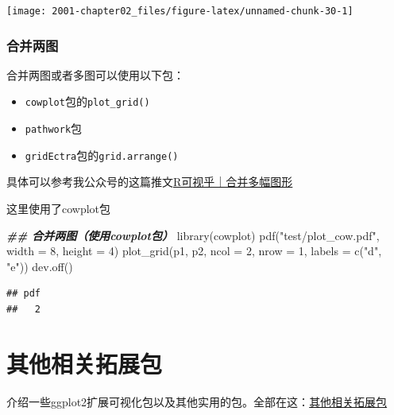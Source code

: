 \documentclass[
]{book}
\newenvironment{Shaded}{\begin{snugshade}}{\end{snugshade}}
\newcommand{\AttributeTok}[1]{\textcolor[rgb]{0.77,0.63,0.00}{#1}}
\newcommand{\DecValTok}[1]{\textcolor[rgb]{0.00,0.00,0.81}{#1}}
\newcommand{\DocumentationTok}[1]{\textcolor[rgb]{0.56,0.35,0.01}{\textbf{\textit{#1}}}}
\newcommand{\FunctionTok}[1]{\textcolor[rgb]{0.00,0.00,0.00}{#1}}
\newcommand{\NormalTok}[1]{#1}
\newcommand{\StringTok}[1]{\textcolor[rgb]{0.31,0.60,0.02}{#1}}
\providecommand{\tightlist}{%
  \setlength{\itemsep}{0pt}\setlength{\parskip}{0pt}}
\begin{document}
\begin{center}\texttt{[image: 2001-chapter02\_files/figure-latex/unnamed-chunk-30-1]} \end{center}

\hypertarget{ux5408ux5e76ux4e24ux56fe}{%
\subsection{合并两图}\label{ux5408ux5e76ux4e24ux56fe}}

合并两图或者多图可以使用以下包：

\begin{itemize}
\tightlist
\item
  \texttt{cowplot}包的\texttt{plot\_grid()}
\item
  \texttt{pathwork}包
\item
  \texttt{gridEctra}包的\texttt{grid.arrange()}
\end{itemize}

具体可以参考我公众号的这篇推文\href{https://mp.weixin.qq.com/s/goFqnPtH85oXAwlxcacRDw}{R可视乎｜合并多幅图形}

这里使用了cowplot包

\begin{Shaded}
\begin{Highlighting}[]
\DocumentationTok{\#\# 合并两图（使用cowplot包）}
\FunctionTok{library}\NormalTok{(cowplot)}
\FunctionTok{pdf}\NormalTok{(}\StringTok{"test/plot\_cow.pdf"}\NormalTok{, }\AttributeTok{width =} \DecValTok{8}\NormalTok{, }\AttributeTok{height =} \DecValTok{4}\NormalTok{)}
\FunctionTok{plot\_grid}\NormalTok{(p1, p2, }\AttributeTok{ncol =} \DecValTok{2}\NormalTok{, }\AttributeTok{nrow =} \DecValTok{1}\NormalTok{, }\AttributeTok{labels =} \FunctionTok{c}\NormalTok{(}\StringTok{"d"}\NormalTok{, }\StringTok{"e"}\NormalTok{))}
\FunctionTok{dev.off}\NormalTok{()}
\end{Highlighting}
\end{Shaded}

\begin{verbatim}
## pdf 
##   2
\end{verbatim}

\hypertarget{other-packages}{%
\chapter{其他相关拓展包}\label{other-packages}}

介绍一些ggplot2扩展可视化包以及其他实用的包。全部在这：\href{https://mp.weixin.qq.com/mp/homepage?__biz=MzI1NjUwMjQxMQ==\&hid=8\&sn=b6495a051d1dc5c81280c41d5236b100\&scene=1\&devicetype=android-29\&version=2700143f\&lang=zh_CN\&nettype=cmnet\&ascene=7\&session_us=gh_b289177c65aa\&wx_header=1}{其他相关拓展包}
\end{document}
